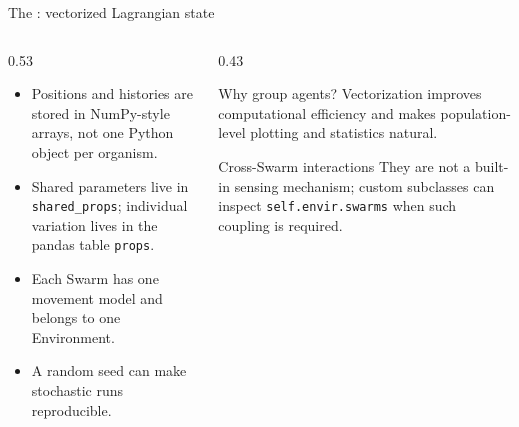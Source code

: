\documentclass[aspectratio=169,11pt]{beamer}
\newcommand{\code}[1]{\texttt{#1}}
\begin{document}
\begin{frame}{The \NoCaseChange{\code{Swarm}}: vectorized Lagrangian state}
\begin{columns}[T,onlytextwidth]
  \begin{column}{0.53\textwidth}
    \begin{itemize}
      \item Positions and histories are stored in NumPy-style arrays, not one Python object per organism.
      \item Shared parameters live in \code{shared\_props}; individual variation lives in the pandas table \code{props}.
      \item Each Swarm has one movement model and belongs to one Environment.
      \item A random seed can make stochastic runs reproducible.
    \end{itemize}
  \end{column}
  \begin{column}{0.43\textwidth}
    \begin{block}{Why group agents?}
      Vectorization improves computational efficiency and makes population-level plotting and statistics natural.
    \end{block}
    \begin{alertblock}{Cross-Swarm interactions}
      They are not a built-in sensing mechanism; custom subclasses can inspect \code{self.envir.swarms} when such coupling is required.
    \end{alertblock}
  \end{column}
\end{columns}
\end{frame}
\end{document}
